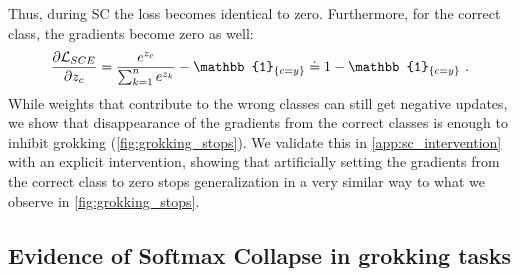 Thus, during SC the loss becomes identical to zero. Furthermore, for the correct class, the gradients become zero as well: 
%
\begin{equation}
    \frac{\partial{ \loss_{SCE}}}{\partial z_{c}} =  \frac{e^{z_c}}{\sum_{k=1}^n e^{z_k}}-\mathbb{1}_{\{c = y\}} \doteq 1 - \mathbb{1}_{\{c = y\}} ~ .
    \label{eq:derivative}
\end{equation}
%
While weights that contribute to the wrong classes can still get negative updates, we show that disappearance of the gradients from the correct classes is enough to inhibit grokking (\cref{fig:grokking_stops}). We validate this in \cref{app:sc_intervention} with an explicit intervention, showing that artificially setting the gradients from the correct class to zero stops generalization in a very similar way to what we observe in \cref{fig:grokking_stops}.


\subsection{Evidence of Softmax Collapse in grokking tasks}

